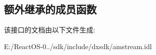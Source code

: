 \subsection*{额外继承的成员函数}


该接口的文档由以下文件生成\+:\begin{DoxyCompactItemize}
\item 
E\+:/\+React\+O\+S-\/0../sdk/include/dxsdk/amstream.\+idl\end{DoxyCompactItemize}
